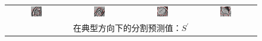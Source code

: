 \begin{figure}
\begin{center}
\begin{tabular}{cccc}
\includegraphics[width=0.19\textwidth]{./data/failures/HCMNet_2000062/00_SAX/9/9_bbox.png} &
\includegraphics[width=0.19\textwidth]{./data/failures/HCMNet_2400044/00_SAX/2/5_bbox.png} &
\includegraphics[width=0.19\textwidth]{./data/failures/HCMNet_2600079/01_HLA/00/0_bbox.png} &
\includegraphics[width=0.19\textwidth]{./data/failures/HCMNet_2600079/02_VLA/00/0_bbox.png} \\

\multicolumn{4}{c}{在典型方向下的分割预测值：$S^\prime$} \\


\end{tabular}
\end{center}
\end{figure}
